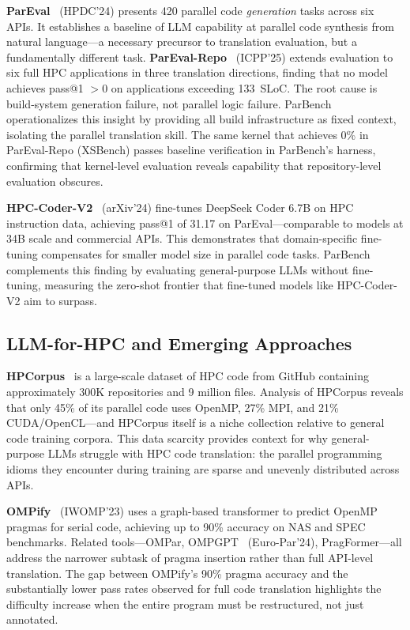 \documentclass[conference]{IEEEtran}
\begin{document}
\textbf{ParEval}~\cite{ParEval2024} (HPDC'24) presents 420 parallel code \emph{generation} tasks across six APIs. It establishes a baseline of LLM capability at parallel code synthesis from natural language---a necessary precursor to translation evaluation, but a fundamentally different task. \textbf{ParEval-Repo}~\cite{ParEvalRepo2025} (ICPP'25) extends evaluation to six full HPC applications in three translation directions, finding that no model achieves pass@1 $> 0$ on applications exceeding 133~SLoC. The root cause is build-system generation failure, not parallel logic failure. ParBench operationalizes this insight by providing all build infrastructure as fixed context, isolating the parallel translation skill. The same kernel that achieves 0\% in ParEval-Repo (XSBench) passes baseline verification in ParBench's harness, confirming that kernel-level evaluation reveals capability that repository-level evaluation obscures.

\textbf{HPC-Coder-V2}~\cite{HPCCoderV2} (arXiv'24) fine-tunes DeepSeek Coder 6.7B on HPC instruction data, achieving pass@1 of 31.17 on ParEval---comparable to models at 34B scale and commercial APIs. This demonstrates that domain-specific fine-tuning compensates for smaller model size in parallel code tasks. ParBench complements this finding by evaluating general-purpose LLMs without fine-tuning, measuring the zero-shot frontier that fine-tuned models like HPC-Coder-V2 aim to surpass.

\subsection{LLM-for-HPC and Emerging Approaches}
\label{sec:llm-hpc}

\textbf{HPCorpus}~\cite{HPCorpus2023} is a large-scale dataset of HPC code from GitHub containing approximately 300K repositories and 9 million files. Analysis of HPCorpus reveals that only 45\% of its parallel code uses OpenMP, 27\% MPI, and 21\% CUDA/OpenCL---and HPCorpus itself is a niche collection relative to general code training corpora. This data scarcity provides context for why general-purpose LLMs struggle with HPC code translation: the parallel programming idioms they encounter during training are sparse and unevenly distributed across APIs.

\textbf{OMPify}~\cite{OMPify2023} (IWOMP'23) uses a graph-based transformer to predict OpenMP pragmas for serial code, achieving up to 90\% accuracy on NAS and SPEC benchmarks. Related tools---OMPar, OMPGPT~\cite{OMPGPT2024} (Euro-Par'24), PragFormer---all address the narrower subtask of pragma insertion rather than full API-level translation. The gap between OMPify's 90\% pragma accuracy and the substantially lower pass rates observed for full code translation highlights the difficulty increase when the entire program must be restructured, not just annotated.
\end{document}
